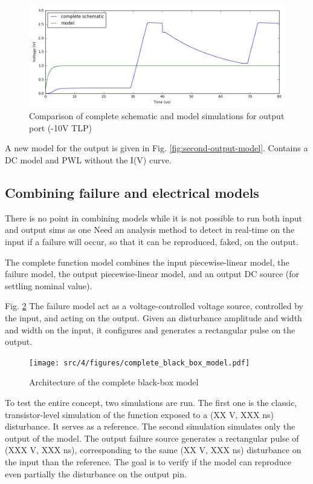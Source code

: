 \begin{figure}[!h]
  \centering
  \includegraphics[width=\textwidth]{src/4/figures/comparison_model_total_output_bad_m10V.png}
  \caption{Comparison of complete schematic and model simulations for output port (-10V TLP)}
  \label{fig:compare-model-simu-m10-output}
\end{figure}

A new model for the output is given in Fig. \ref{fig:second-output-model}.
Contains a DC model and PWL without the I(V) curve.

\subsection{Combining failure and electrical models}

There is no point in combining models while it is not possible to run both input and output sims as one
Need an analysis method to detect in real-time on the input if a failure will occur, so that it can be reproduced, faked, on the output.

The complete function model combines the input piecewise-linear model, the failure model, the output piecewise-linear model, and an output DC source (for settling nominal value).

Fig. \ref{fig:complete-black-box-model}
The failure model act as a voltage-controlled voltage source, controlled by the input, and acting on the output.
Given an disturbance amplitude and width and width on the input, it configures and generates a rectangular pulse on the output.

\begin{figure}[!h]
  \centering
  \texttt{[image: src/4/figures/complete\_black\_box\_model.pdf]}
  \caption{Architecture of the complete black-box model}
  \label{fig:complete-black-box-model}
\end{figure}

To test the entire concept, two simulations are run.
The first one is the classic, transistor-level simulation of the function exposed to a (XX V, XXX ns) disturbance.
It serves as a reference.
The second simulation simulates only the output of the model.
The output failure source generates a rectangular pulse of (XXX V, XXX ns), corresponding to the same (XX V, XXX ns) disturbance on the input than the reference.
The goal is to verify if the model can reproduce even partially the disturbance on the output pin.

